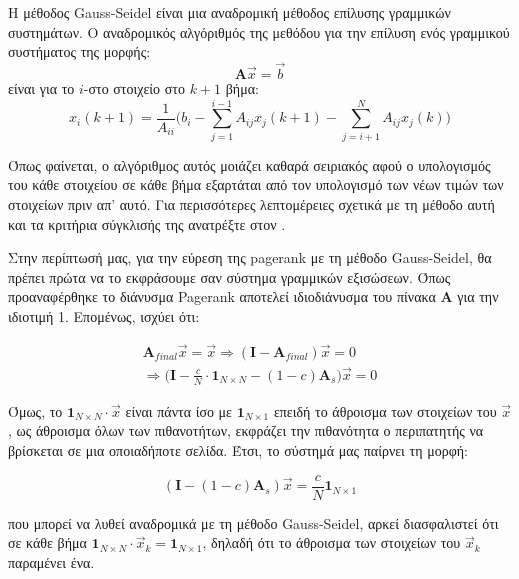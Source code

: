 H μέθοδος Gauss-Seidel είναι μια αναδρομική μέθοδος επίλυσης γραμμικών συστημάτων. Ο αναδρομικός αλγόριθμός της μεθόδου για την επίλυση ενός γραμμικού συστήματος της μορφής:
$$\bm{A}\vec{x}=\vec{b}$$
είναι για το $i$-στο στοιχείο στο $k+1$ βήμα:
$$x_i(k+1) = \frac{1}{A_{ii}}\bigg(b_i-\sum_{j=1}^{i-1}A_{ij}x_j(k+1)-\sum_{j=i+1}^{N}A_{ij}x_j(k)\bigg)$$

Όπως φαίνεται, ο αλγόριθμος αυτός μοιάζει καθαρά σειριακός αφού ο υπολογισμός του κάθε στοιχείου σε κάθε βήμα εξαρτάται από τον υπολογισμό των νέων τιμών των στοιχείων πριν απ' αυτό.
Για περισσότερες λεπτομέρειες σχετικά με τη μέθοδο αυτή και τα κριτήρια σύγκλισής της ανατρέξτε στον \textcite{saad2003iterative}.

Στην περίπτωσή μας, για την εύρεση της pagerank με τη μέθοδο Gauss-Seidel, θα πρέπει πρώτα να το εκφράσουμε σαν σύστημα γραμμικών εξισώσεων. Όπως προαναφέρθηκε το διάνυσμα Pagerank αποτελεί ιδιοδιάνυσμα του πίνακα $\bm{A}$ για την ιδιοτιμή 1. Επομένως, ισχύει ότι:

\begin{gather*}
\bm{A}_{final}\vec{x} = \vec{x}\Rightarrow (\bm{I}-\bm{A}_{final})\vec{x} = 0 \\
\Rightarrow \bigg(\bm{I}-\frac{c}{N}\cdot\bm{1}_{N\times N}-(1-c)\bm{A}_s\bigg)\vec{x} = 0
\end{gather*}

Όμως, το $\bm{1}_{N\times N}\cdot\vec{x}$ είναι πάντα ίσο με $\bm{1}_{N\times1}$ επειδή το άθροισμα των στοιχείων του $\vec{x}$, ως άθροισμα όλων των πιθανοτήτων, εκφράζει την πιθανότητα ο περιπατητής να βρίσκεται σε μια οποιαδήποτε σελίδα. Έτσι, το σύστημά μας παίρνει τη μορφή:

$$(\bm{I}-(1-c)\bm{A}_s)\vec{x} = \frac{c}{N}\bm{1}_{N\times1}$$

που μπορεί να λυθεί αναδρομικά με τη μέθοδο Gauss-Seidel, αρκεί διασφαλιστεί ότι σε κάθε βήμα $\bm{1}_{N\times N}\cdot\vec{x}_k =\bm{1}_{N\times1}$, δηλαδή ότι το άθροισμα των στοιχείων του $\vec{x}_k$ παραμένει ένα.
